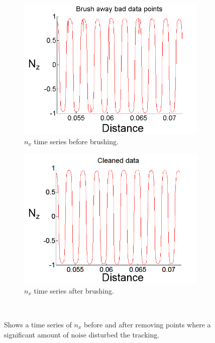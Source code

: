 \begin{figure}[H]
\centering
\begin{subfigure}[3a]{0.40\textwidth}
\includegraphics[width=\textwidth]{figures/method/Brushing1.png}
\caption{$n_x$ time series before brushing.}\label{fig:prebrush}
\end{subfigure}\hspace{1em}%
\begin{subfigure}[3b]{0.40\textwidth}
\includegraphics[width=\textwidth]{figures/method/Brushing2.png}
\caption{$n_x$ time series after brushing.}\label{fig:postbrush}
\end{subfigure} \\
\caption{Shows a time series of $n_x$ before and after removing points where a significant amount of noise disturbed the tracking. } \label{fig:brushed}
\end{figure}
